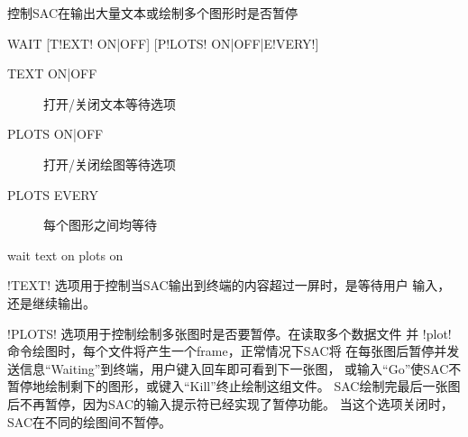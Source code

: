 \label{cmd:wait}

控制SAC在输出大量文本或绘制多个图形时是否暂停

\begin{SACSTX}
WAIT [T!EXT! ON|OFF] [P!LOTS! ON|OFF|E!VERY!]
\end{SACSTX}

\begin{description}
\item [TEXT ON|OFF] 打开/关闭文本等待选项
\item [PLOTS ON|OFF] 打开/关闭绘图等待选项
\item [PLOTS EVERY] 每个图形之间均等待
\end{description}

\begin{SACDFT}
wait text on plots on
\end{SACDFT}

!TEXT! 选项用于控制当SAC输出到终端的内容超过一屏时，是等待用户
输入，还是继续输出。

!PLOTS! 选项用于控制绘制多张图时是否要暂停。在读取多个数据文件
并 !plot! 命令绘图时，每个文件将产生一个frame，正常情况下SAC将
在每张图后暂停并发送信息``Waiting''到终端，用户键入回车即可看到下一张图，
或输入``Go''使SAC不暂停地绘制剩下的图形，或键入``Kill''终止绘制这组文件。
SAC绘制完最后一张图后不再暂停，因为SAC的输入提示符已经实现了暂停功能。
当这个选项关闭时，SAC在不同的绘图间不暂停。
